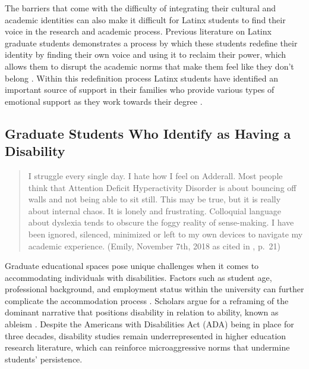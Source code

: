 \documentclass[
  11pt,
]{book}
\begin{document}
The barriers that come with the difficulty of integrating their cultural and academic identities can also make it difficult for Latinx students to find their voice in the research and academic process. Previous literature on Latinx graduate students demonstrates a process by which these students redefine their identity by finding their own voice and using it to reclaim their power, which allows them to disrupt the academic norms that make them feel like they don't belong \citep{locke_counterstory_2022, ramos_conociendo_2020}. Within this redefinition process Latinx students have identified an important source of support in their families who provide various types of emotional support as they work towards their degree \citep{crumb_fostering_2022, locke_counterstory_2022, ramos_conociendo_2020}.

\subsection{Graduate Students Who Identify as Having a Disability}\label{graduate-students-who-identify-as-having-a-disability}

\begin{quote}
I struggle every single day. I hate how I feel on Adderall. Most people think that Attention Deficit Hyperactivity Disorder is about bouncing off walls and not being able to sit still. This may be true, but it is really about internal chaos. It is lonely and frustrating. Colloquial language about dyslexia tends to obscure the foggy reality of sense-making. I have been ignored, silenced, minimized or left to my own devices to navigate my academic experience. (Emily, November 7th, 2018 as cited in \citet{koren_laissez-faire_2020}, p.~21)
\end{quote}

Graduate educational spaces pose unique challenges when it comes to accommodating individuals with disabilities. Factors such as student age, professional background, and employment status within the university can further complicate the accommodation process \citep{koren_laissez-faire_2020}. Scholars argue for a reframing of the dominant narrative that positions disability in relation to ability, known as ableism \citep{koren_laissez-faire_2020}. Despite the Americans with Disabilities Act (ADA) being in place for three decades, disability studies remain underrepresented in higher education research literature, which can reinforce microaggressive norms that undermine students' persistence.
\end{document}
